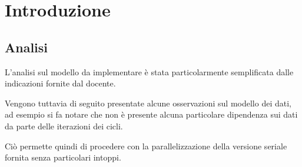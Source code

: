 \section{Introduzione}

\subsection{Analisi}
L'analisi sul modello da implementare è stata particolarmente semplificata dalle
indicazioni fornite dal docente.

Vengono tuttavia di seguito presentate alcune osservazioni sul modello dei dati,
ad esempio si fa notare che non è presente alcuna particolare dipendenza sui
dati da parte delle iterazioni dei cicli.

Ciò permette quindi di procedere con la parallelizzazione della versione seriale
fornita senza particolari intoppi.
